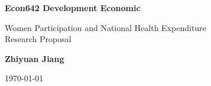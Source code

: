 \begin{titlepage}
\begin{center}
\vspace*{1cm}
\Huge
\textbf{Econ642 Development Economic}

\vspace{0.5cm}
\LARGE
Women Participation and National Health Expenditure
\\
\Large
Research Proposal

\vspace{1.5 cm}
\textbf{Zhiyuan Jiang\\}
\vfill

\vspace{0.8cm}
 
\Large
\today
\end{center}
\end{titlepage}